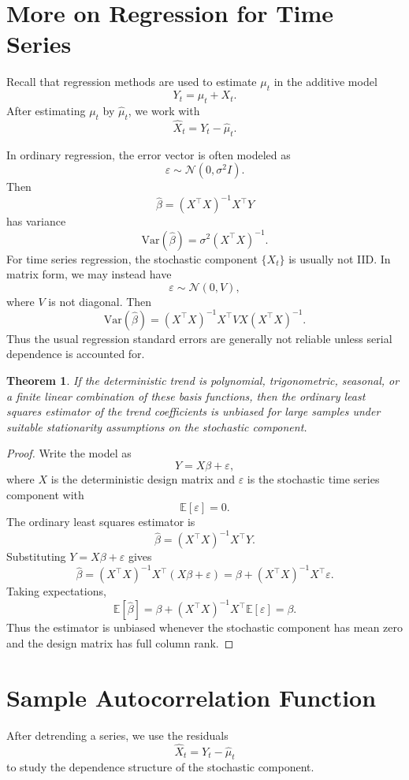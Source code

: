\documentclass[12pt,oneside]{book}
\numberwithin{equation}{section}
\theoremstyle{definition}
\theoremstyle{plain}
\newtheorem{theorem}{Theorem}[section]
\theoremstyle{remark}
\newcommand{\E}{\mathbb{E}}
\newcommand{\Var}{\mathrm{Var}}
\newcommand{\Normal}{\mathcal{N}}
\begin{document}
\section{More on Regression for Time Series}

Recall that regression methods are used to estimate $\mu_t$ in the additive model
\[
Y_t=\mu_t+X_t.
\]
After estimating $\mu_t$ by $\widehat{\mu}_t$, we work with
\[
\widehat{X}_t=Y_t-\widehat{\mu}_t.
\]

In ordinary regression, the error vector is often modeled as
\[
\varepsilon\sim\Normal(0,\sigma^2I).
\]
Then
\[
\widehat{\beta}
=
(X^\top X)^{-1}X^\top Y
\]
has variance
\[
\Var(\widehat{\beta})
=
\sigma^2(X^\top X)^{-1}.
\]
For time series regression, the stochastic component $\{X_t\}$ is usually not IID. In matrix form, we may instead have
\[
\varepsilon\sim\Normal(0,V),
\]
where $V$ is not diagonal. Then
\[
\Var(\widehat{\beta})
=
(X^\top X)^{-1}X^\top VX(X^\top X)^{-1}.
\]
Thus the usual regression standard errors are generally not reliable unless serial dependence is accounted for.

\begin{theorem}
If the deterministic trend is polynomial, trigonometric, seasonal, or a finite linear combination of these basis functions, then the ordinary least squares estimator of the trend coefficients is unbiased for large samples under suitable stationarity assumptions on the stochastic component.
\end{theorem}

\begin{proof}
Write the model as
\[
Y=X\beta+\varepsilon,
\]
where $X$ is the deterministic design matrix and $\varepsilon$ is the stochastic time series component with
\[
\E[\varepsilon]=0.
\]
The ordinary least squares estimator is
\[
\widehat{\beta}=(X^\top X)^{-1}X^\top Y.
\]
Substituting $Y=X\beta+\varepsilon$ gives
\[
\widehat{\beta}
=
(X^\top X)^{-1}X^\top(X\beta+\varepsilon)
=
\beta+(X^\top X)^{-1}X^\top\varepsilon.
\]
Taking expectations,
\[
\E[\widehat{\beta}]
=
\beta+(X^\top X)^{-1}X^\top\E[\varepsilon]
=
\beta.
\]
Thus the estimator is unbiased whenever the stochastic component has mean zero and the design matrix has full column rank.
\end{proof}

\section{Sample Autocorrelation Function}

After detrending a series, we use the residuals
\[
\widehat{X}_t=Y_t-\widehat{\mu}_t
\]
to study the dependence structure of the stochastic component.
\end{document}
